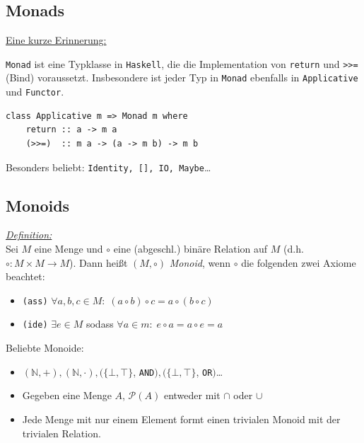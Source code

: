 \documentclass{beamer}
\begin{document}
\subsection*{Monads}

\begin{frame}[fragile]

\underline{Eine kurze Erinnerung:}\bigskip

\texttt{Monad} ist eine Typklasse in \texttt{Haskell}, die die Implementation von \texttt{return} und \texttt{>>=} (Bind) voraussetzt. Insbesondere ist jeder Typ in \texttt{Monad} ebenfalls in \texttt{Applicative} und \texttt{Functor}.\bigskip

\begin{verbatim}
class Applicative m => Monad m where
    return :: a -> m a
    (>>=)  :: m a -> (a -> m b) -> m b
\end{verbatim}
\pause

Besonders beliebt: \texttt{Identity, [], IO, Maybe}\dots
\end{frame}

\subsection*{Monoids}

\begin{frame}
\underline{\emph{Definition:}}\\ Sei $M$ eine Menge und $\circ$ eine (abgeschl.) binäre Relation auf $M$ (d.h. $\circ : M \times M \to M$). Dann heißt $(M, \circ)$ \emph{Monoid}, wenn $\circ$ die folgenden zwei Axiome beachtet:

\begin{itemize}
\pause \item \texttt{(ass)} $\forall a,b,c \in M:\; (a \circ b) \circ c = a \circ (b \circ c)$
\pause \item \texttt{(ide)} $\exists e \in M$ sodass $\forall a \in m:\; e \circ a = a \circ e = a$
\end{itemize}
\pause\bigskip

Beliebte Monoide:
\begin{itemize}
\pause \item $(\mathbb{N}, +), (\mathbb{N}, \cdot), (\{\bot, \top\}$, \texttt{AND}$), (\{\bot, \top\}$, \texttt{OR}$)$\dots
\pause \item Gegeben eine Menge $A$, $\mathcal{P}(A)$ entweder mit $\cap$ oder $\cup$
\pause \item Jede Menge mit nur einem Element formt einen trivialen Monoid mit der trivialen Relation.
\end{itemize}

\end{frame}
\end{document}
